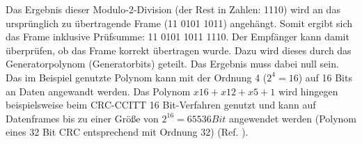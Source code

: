 Das Ergebnis dieser Modulo-2-Division (der Rest in Zahlen: 1110) wird an das
urspr{\"u}nglich zu {\"u}bertragende Frame (11 0101 1011) angeh{\"a}ngt. Somit ergibt sich
das Frame inklusive Pr{\"u}fsumme: 11 0101 1011 1110. Der
Empf{\"a}nger kann damit {\"u}berpr{\"u}fen, ob das Frame korrekt {\"u}bertragen
wurde. Dazu wird dieses durch das Generatorpolynom (Generatorbits) geteilt.
Das Ergebnis muss dabei null sein. Das im Beispiel genutzte Polynom kann mit der
Ordnung 4 ($2^4=16$) auf 16 Bits an Daten angewandt werden. Das Polynom $x16+x12+x5+1$
wird hingegen beispielsweise beim CRC-CCITT 16 Bit-Verfahren genutzt und
kann auf Datenframes bis zu einer Gr{\"o}{\ss}e von $2^{16}=65536 Bit$
angewendet werden (Polynom eines 32 Bit CRC entsprechend mit Ordnung 32) (Ref.
\cite{web2}).

